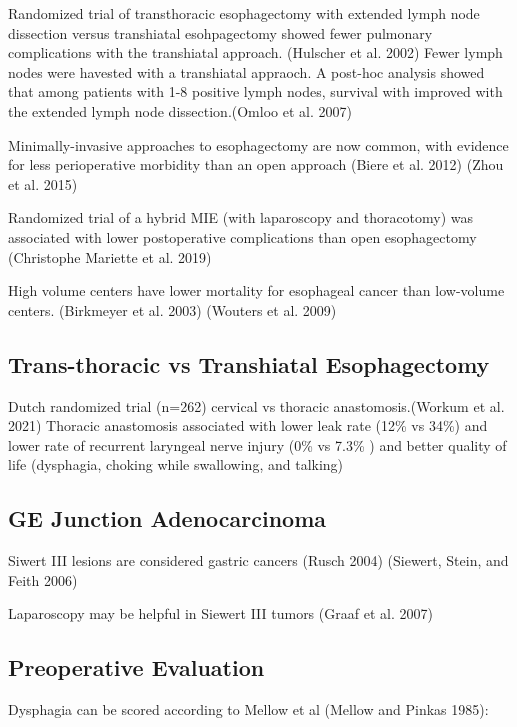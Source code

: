 \documentclass[
  letterpaper,
]{scrbook}
\begin{document}
Randomized trial of transthoracic esophagectomy with extended lymph node
dissection versus transhiatal esohpagectomy showed fewer pulmonary
complications with the transhiatal approach. (Hulscher et al. 2002)
Fewer lymph nodes were havested with a transhiatal appraoch. A post-hoc
analysis showed that among patients with 1-8 positive lymph nodes,
survival with improved with the extended lymph node dissection.(Omloo et
al. 2007)

Minimally-invasive approaches to esophagectomy are now common, with
evidence for less perioperative morbidity than an open approach (Biere
et al. 2012) (Zhou et al. 2015)

Randomized trial of a hybrid MIE (with laparoscopy and thoracotomy) was
associated with lower postoperative complications than open
esophagectomy (Christophe Mariette et al. 2019)

High volume centers have lower mortality for esophageal cancer than
low-volume centers. (Birkmeyer et al. 2003) (Wouters et al. 2009)

\subsection{Trans-thoracic vs Transhiatal
Esophagectomy}\label{trans-thoracic-vs-transhiatal-esophagectomy}

Dutch randomized trial (n=262) cervical vs thoracic anastomosis.(Workum
et al. 2021) Thoracic anastomosis associated with lower leak rate (12\%
vs 34\%) and lower rate of recurrent laryngeal nerve injury (0\% vs
7.3\% ) and better quality of life (dysphagia, choking while swallowing,
and talking)

\subsection{GE Junction
Adenocarcinoma}\label{ge-junction-adenocarcinoma}

Siwert III lesions are considered gastric cancers (Rusch 2004) (Siewert,
Stein, and Feith 2006)

Laparoscopy may be helpful in Siewert III tumors (Graaf et al. 2007)

\subsection{Preoperative Evaluation}\label{preoperative-evaluation-2}

Dysphagia can be scored according to Mellow et al (Mellow and Pinkas
1985):
\end{document}
